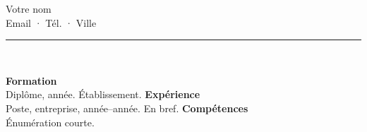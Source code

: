 \documentclass[11pt,a4paper]{article}
\begin{document}
\begin{center}
\vspace{0.5cm}
{\LARGE Votre nom}\\[0.8em]
Email \quad · \quad Tél. \quad · \quad Ville\\[0.6em]
\rule{1.8cm}{2.2cm}\\[0.6em]
\end{center}
\vspace{1em}
\textbf{Formation}\\
Diplôme, année. Établissement.
\vspace{0.8em}
\textbf{Expérience}\\
Poste, entreprise, année--année. En bref.
\vspace{0.8em}
\textbf{Compétences}\\
Énumération courte.
\end{document}
